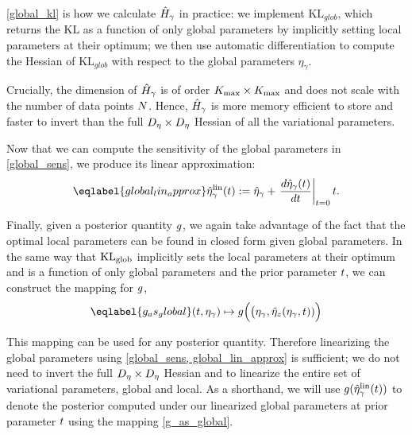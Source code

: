 \eqref{global_kl} is how we calculate $\hat{H}_\gamma$ in practice:
we implement $\mathrm{KL}_{glob}$, which returns the $\mathrm{KL}$ as a function of only global parameters
by implicitly setting local parameters at their optimum;
we then use automatic differentiation to
compute the Hessian of $\mathrm{KL}_{glob}$
with respect to the global parameters $\eta_\gamma$.

Crucially, the dimension of $\hat{H}_\gamma$ is of order ${K_{\mathrm{max}}} \times {K_{\mathrm{max}}}$
and does not scale with the number of data points $N$.
Hence, $\hat{H}_\gamma$ is more memory efficient to store
and faster to invert
than the full ${D_{\eta}}\times{D_{\eta}}$ Hessian of all the variational parameters.


Now that we can compute the sensitivity of the global parameters in
\eqref{global_sens}, we produce its linear approximation:
\begin{align}\eqlabel{global_lin_approx}
  \etalin_\gamma(\t) := \etaopt_\gamma +
  \fracat{d \etaopt_\gamma(\t)}{d \t}{\t=0} \t .
\end{align}

Finally, given a posterior quantity $g$,
we again take advantage of the fact that the optimal
local parameters can be found in closed form given global parameters.
In the same way that $\mathrm{KL}_{\mathrm{glob}}$ implicitly sets the local parameters at their optimum
and is a function of only global parameters and the prior parameter $t$,
we can construct the mapping for $g$,
\begin{align}\eqlabel{g_as_global}
(\t, \etaglob) \mapsto g\Big(\big(\etaglob, \etaoptz(\etaglob, \t))\Big)
\end{align}

This mapping can be used for any posterior quantity.
Therefore linearizing the global parameters using \eqref{global_sens, global_lin_approx} is sufficient;
we do not need to invert the full ${D_{\eta}}\times{D_{\eta}}$ Hessian
and to linearize the entire set of variational parameters, global and local.
As a shorthand, we will use $g(\hat\eta^{\mathrm{lin}}_\gamma(t))$ to
denote the posterior computed under our linearized global parameters
at prior parameter $t$ using the mapping \eqref{g_as_global}.


